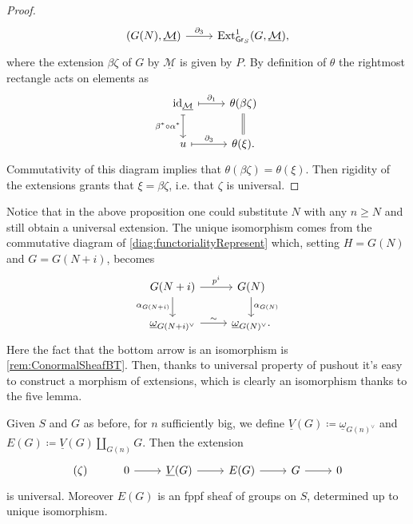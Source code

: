\documentclass[../Main]{subfiles}
\begin{document}
\begin{proof}
\begin{equation*}
\begin{tikzcd}
		\left( G(N), \underline{\mathcal{M}} \right) 
		\arrow[r, "\partial_3", rightarrow] &
		\mathrm{Ext}^1_{\mathsf{Gr}_S}
		(G,\underline{\mathcal{M}})
	,\end{tikzcd}
	\end{equation*}
	where the extension $\beta\zeta$ of $G$ by $\underline{\mathcal{M}}$ is given by $P$.
	By definition of $\theta$ the rightmost rectangle acts on elements as
	\begin{equation*}
	\begin{tikzcd}
		\mathrm{id}_{ \underline{\mathcal{M}} }
		\arrow[r, "\partial_1", mapsto] 
		\arrow[d, "\beta^* \circ \alpha^*"', mapsto] &
		\theta(\beta\zeta)
		\arrow[d, "", equal] \\
		u \arrow[r, "\partial_3", mapsto] &
		\theta(\xi)
	.\end{tikzcd}
	\end{equation*}
	Commutativity of this diagram implies that $\theta(\beta\zeta) = \theta(\xi)$.
	Then rigidity of the extensions grants that $\xi = \beta\zeta$, i.e.
	that $\zeta$ is universal.
\end{proof}


\begin{rem}
	Notice that in the above proposition one could substitute
	$N$ with any $n \geq N$ and still obtain a universal extension.
	The unique isomorphism comes from the commutative diagram
	of \cref{diag:functorialityRepresent}
	which, setting $H = G(N)$ and $G = G(N+i)$, becomes
	\begin{equation*}
	\begin{tikzcd}
		G(N+i) \arrow[r, "p^i", rightarrow] 
		\arrow[d, "\alpha_{G(N+i)}"', rightarrow] &
		G(N) \arrow[d, "\alpha_{G(N)}", rightarrow] \\
		\underline{\omega}_{G(N+i)^\vee} \arrow[r, "\sim", rightarrow] &
		\underline{\omega}_{G(N)^\vee}
	.\end{tikzcd}
	\end{equation*}
	Here the fact that the bottom arrow is an isomorphism
	is \cref{rem:ConormalSheafBT}.
	Then, thanks to universal property of pushout it's easy to construct
	a morphism of extensions, which is clearly an isomorphism
	thanks to the five lemma.
\end{rem}


\begin{defn}[]
	Given $S$ and $G$ as before, for $n$ sufficiently big, we define
	$\underline{V}(G) \coloneqq \underline{\omega}_{G(n)^\vee}$ and
	$E(G) \coloneqq \underline{V}(G) \amalg_{G(n)} G$.
	Then the extension
	\begin{equation*}
	\begin{tikzcd}
		(\zeta) &
		0 \arrow[r, "", rightarrow] &
		\underline{V}(G) \arrow[r, "", rightarrow] &
		E(G) \arrow[r, "", rightarrow] &
		G \arrow[r, "", rightarrow] &
		0
	\end{tikzcd}
	\end{equation*}
	is universal.
	Moreover $E(G)$ is an fppf sheaf of groups on $S$,
	determined up to unique isomorphism.
\end{defn}
\end{document}
